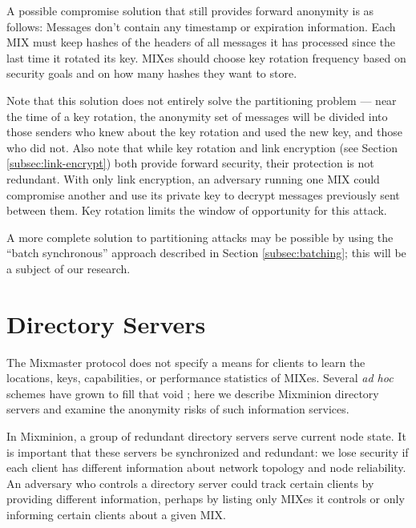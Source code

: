 \documentclass{llncs}
\begin{document}
A possible compromise solution that still provides forward anonymity
is as follows:  Messages don't
contain any timestamp or expiration information. Each MIX must keep
hashes of the headers of all messages it has processed since the last time
it rotated its key. MIXes should choose key rotation frequency based on
security goals and on how many hashes they want to store.

Note that this solution does not entirely solve the partitioning problem
--- near the time of a key rotation, the anonymity set of messages will
be divided into those senders who knew about the key rotation and used
the new key, and those who did not.
Also note that while key rotation and link encryption (see Section
\ref{subsec:link-encrypt}) both provide forward security, their protection
is not redundant. With only link encryption, an adversary running
one MIX could compromise another and use its private key to decrypt
messages previously sent between them. Key rotation limits the window
of opportunity for this attack.

A more complete solution to partitioning attacks may be possible by
using the ``batch synchronous'' approach described in
Section \ref{subsec:batching}; this will be a subject of our research.


\section{Directory Servers}
\label{sec:dir-servers}

The Mixmaster protocol does not specify a means for clients to learn the
locations, keys, capabilities, or performance statistics of MIXes. Several
\emph{ad hoc} schemes have grown to fill that void \cite{levien}; here
we describe Mixminion directory servers and examine the anonymity risks
of such information services.


In Mixminion, a group of redundant directory servers serve current
node state.  It is important that these servers be synchronized and
redundant:  we lose security if each client has different information
about network topology and node reliability. An adversary who controls
a directory server could track certain clients by providing different
information, perhaps by listing only MIXes it controls or only
informing certain clients about a given MIX.
\end{document}

